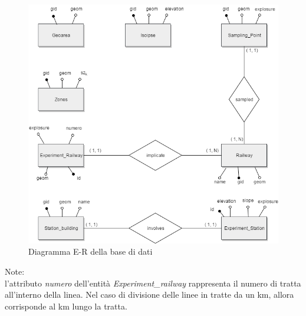 \begin{figure}[h]
	\centering
	\includegraphics[width=1\textwidth]{img/er}
	\caption{Diagramma E-R della base di dati}
    \label{fig:er}
\end{figure}

Note:\\
l'attributo \textit{numero} dell'entità \textit{Experiment\_railway} rappresenta il numero di tratta all'interno della linea. Nel caso di divisione delle linee in tratte da un km, allora corrisponde al km lungo la tratta.
\pagebreak

